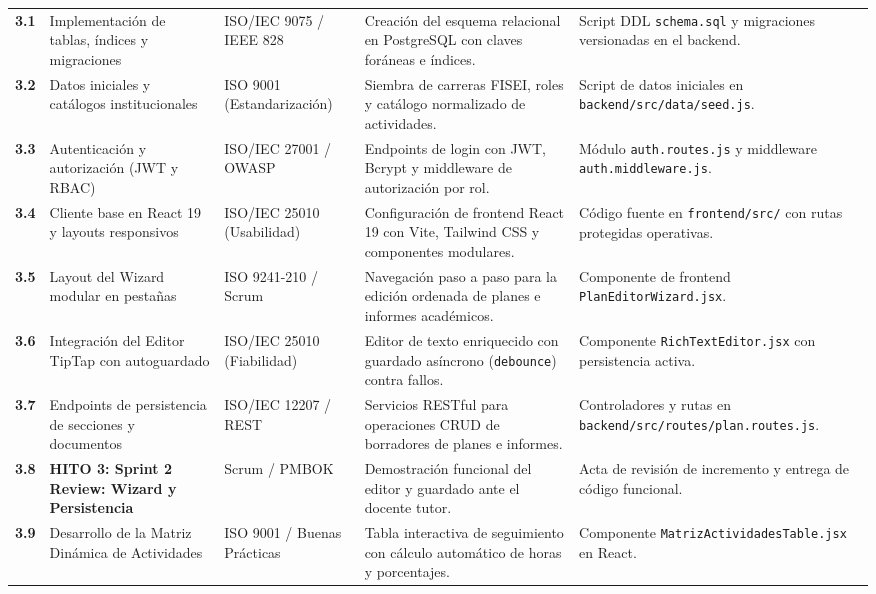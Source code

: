 \documentclass[12pt,a4paper]{article}
\begin{document}
\begin{longtable}{|>{\centering\arraybackslash}m{1.4cm}|>{\raggedright\arraybackslash}m{3.2cm}|>{\raggedright\arraybackslash}m{2.6cm}|>{\raggedright\arraybackslash}m{4.6cm}|>{\raggedright\arraybackslash}m{3.4cm}|}
\multicolumn{5}{|l|}{\cellcolor{lightgraybg}\textbf{FASE 3: DESARROLLO ITERATIVO CORE}} \\ \hline
\textbf{3.1} & Implementación de tablas, índices y migraciones & ISO/IEC 9075 / IEEE 828 & Creación del esquema relacional en PostgreSQL con claves foráneas e índices. & Script DDL \texttt{schema.sql} y migraciones versionadas en el backend. \\ \hline
\textbf{3.2} & Datos iniciales y catálogos institucionales & ISO 9001 (Estandarización) & Siembra de carreras FISEI, roles y catálogo normalizado de actividades. & Script de datos iniciales en \texttt{backend/src/data/seed.js}. \\ \hline
\textbf{3.3} & Autenticación y autorización (JWT y RBAC) & ISO/IEC 27001 / OWASP & Endpoints de login con JWT, Bcrypt y middleware de autorización por rol. & Módulo \texttt{auth.routes.js} y middleware \texttt{auth.middleware.js}. \\ \hline
\textbf{3.4} & Cliente base en React 19 y layouts responsivos & ISO/IEC 25010 (Usabilidad) & Configuración de frontend React 19 con Vite, Tailwind CSS y componentes modulares. & Código fuente en \texttt{frontend/src/} con rutas protegidas operativas. \\ \hline
\textbf{3.5} & Layout del Wizard modular en pestañas & ISO 9241-210 / Scrum & Navegación paso a paso para la edición ordenada de planes e informes académicos. & Componente de frontend \texttt{PlanEditorWizard.jsx}. \\ \hline
\textbf{3.6} & Integración del Editor TipTap con autoguardado & ISO/IEC 25010 (Fiabilidad) & Editor de texto enriquecido con guardado asíncrono (\texttt{debounce}) contra fallos. & Componente \texttt{RichTextEditor.jsx} con persistencia activa. \\ \hline
\textbf{3.7} & Endpoints de persistencia de secciones y documentos & ISO/IEC 12207 / REST & Servicios RESTful para operaciones CRUD de borradores de planes e informes. & Controladores y rutas en \texttt{backend/src/routes/plan.routes.js}. \\ \hline
\textbf{3.8} & \textbf{HITO 3: Sprint 2 Review: Wizard y Persistencia} & Scrum / PMBOK & Demostración funcional del editor y guardado ante el docente tutor. & Acta de revisión de incremento y entrega de código funcional. \\ \hline
\textbf{3.9} & Desarrollo de la Matriz Dinámica de Actividades & ISO 9001 / Buenas Prácticas & Tabla interactiva de seguimiento con cálculo automático de horas y porcentajes. & Componente \texttt{MatrizActividadesTable.jsx} en React. \\ \hline

\end{longtable}
\end{document}
